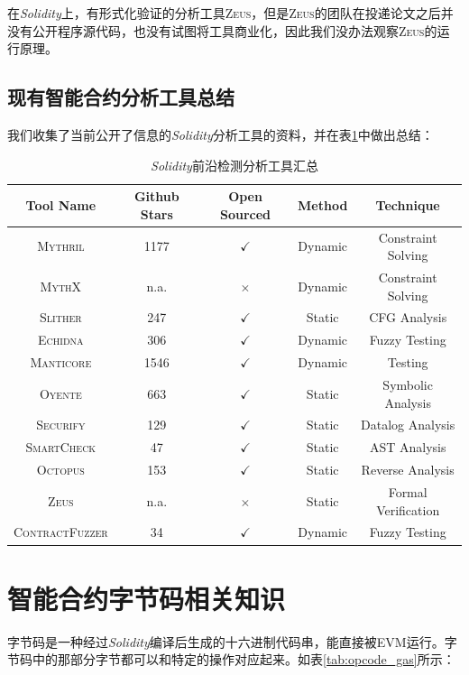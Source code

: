 在\emph{Solidity}上，有形式化验证的分析工具\textsc{Zeus}，但是\textsc{Zeus}的团队在投递论文之后并没有公开程序源代码，也没有试图将工具商业化，因此我们没办法观察\textsc{Zeus}的运行原理。

\subsection{现有智能合约分析工具总结}

我们收集了当前公开了信息的\emph{Solidity}分析工具的资料，并在表\ref{tab:all_tools}中做出总结：

\begin{table}[h]
    \centering
    \caption{\emph{Solidity}前沿检测分析工具汇总}
    \small
    \begin{tabular}{ccccc}
\toprule
 Tool Name & Github Stars & Open Sourced & Method & Technique \\
 \midrule
 \textsc{Mythril} & 1177 & $\checkmark$ & Dynamic & Constraint Solving \\
 \textsc{MythX} & n.a.& $\times$ & Dynamic & Constraint Solving    \\
 \textsc{Slither} & 247 & $\checkmark$ & Static & CFG Analysis   \\
 \textsc{Echidna} & 306 & $\checkmark$ & Dynamic & Fuzzy Testing  \\
 \textsc{Manticore} & 1546 & $\checkmark$ & Dynamic & Testing  \\
 \textsc{Oyente} & 663 & $\checkmark$ &  Static & Symbolic Analysis   \\
 \textsc{Securify} & 129 & $\checkmark$ &  Static & Datalog Analysis   \\
 \textsc{SmartCheck} & 47 & $\checkmark$ & Static & AST Analysis  \\
 \textsc{Octopus} & 153 & $\checkmark$ & Static & Reverse Analysis  \\
 \textsc{Zeus} & n.a. & $\times$ & Static & Formal Verification   \\
 \textsc{ContractFuzzer} & 34 & $\checkmark$ & Dynamic & Fuzzy Testing  \\
 \bottomrule
\end{tabular}
\label{tab:all_tools}
\end{table}

\section{智能合约字节码相关知识}

字节码是一种经过\emph{Solidity}编译后生成的十六进制代码串，能直接被EVM运行。字节码中的那部分字节都可以和特定的操作对应起来。如表\ref{tab:opcode_gas}所示：

